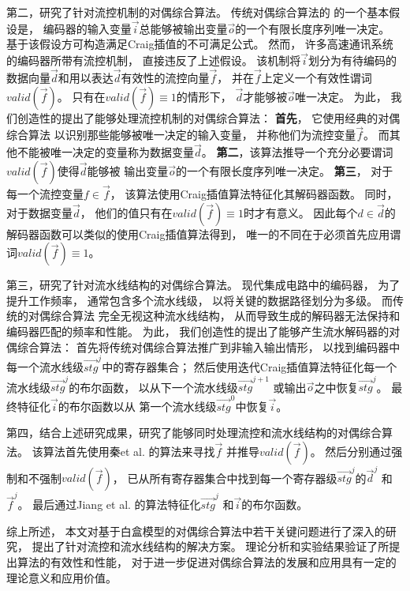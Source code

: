第二，研究了针对流控机制的对偶综合算法。
传统对偶综合算法的 的一个基本假设是，
编码器的输入变量$\vec{i}$总能够被输出变量$\vec{o}$的一个有限长度序列唯一决定。
基于该假设方可构造满足Craig插值的不可满足公式。
然而，
许多高速通讯系统的编码器所带有流控机制，
直接违反了上述假设。
该机制将$\vec{i}$划分为有待编码的数据向量$\vec{d}$和用以表达$\vec{d}$有效性的流控向量$\vec{f}$，
并在$\vec{f}$上定义一个有效性谓词$valid(\vec{f})$。
只有在$valid(\vec{f})\equiv 1$的情形下，
$\vec{d}$才能够被$\vec{o}$唯一决定。
为此，
我们创造性的提出了能够处理流控机制的对偶综合算法：
\textbf{首先}，
它使用经典的对偶综合算法
以识别那些能够被唯一决定的输入变量，
并称他们为流控变量$\vec{f}$。
而其他不能被唯一决定的变量称为数据变量$\vec{d}$。
\textbf{第二}，该算法推导一个充分必要谓词$valid(\vec{f})$使得$\vec{d}$能够被
输出变量$\vec{o}$的一个有限长度序列唯一决定。
\textbf{第三}，
对于每一个流控变量$f\in\vec{f}$，
该算法使用Craig插值算法特征化其解码器函数。
同时，
对于数据变量$\vec{d}$，
他们的值只有在$valid(\vec{f}) \equiv 1$时才有意义。
因此每个$d\in\vec{d}$的解码器函数可以类似的使用Craig插值算法得到，
唯一的不同在于必须首先应用谓词$valid(\vec{f}) \equiv 1$。



第三，研究了针对流水线结构的对偶综合算法。
现代集成电路中的编码器，
为了提升工作频率，
通常包含多个流水线级，
以将关键的数据路径划分为多级。
而传统的对偶综合算法
完全无视这种流水线结构，
从而导致生成的解码器无法保持和编码器匹配的频率和性能。
为此，
我们创造性的提出了能够产生流水解码器的对偶综合算法：
首先将传统对偶综合算法推广到非输入输出情形，
以找到编码器中每一个流水线级$\vec{stg}^j$中的寄存器集合；
然后使用迭代Craig插值算法特征化每一个流水线级$\vec{stg}^j$的布尔函数，
以从下一个流水线级$\vec{stg}^{j+1}$ 或输出$\vec{o}$之中恢复$\vec{stg}^j$。
最终特征化$\vec{i}$的布尔函数以从
第一个流水线级$\vec{stg}^0$中恢复$\vec{i}$。

第四，结合上述研究成果，研究了能够同时处理流控和流水线结构的对偶综合算法。
该算法首先使用秦et al. \cite{QinTODAES15}的算法来寻找$\vec{f}$ 并推导$valid(\vec{f})$。
然后分别通过强制和不强制$valid(\vec{f})$，
已从所有寄存器集合中找到每一个寄存器级$\vec{stg}^j$的$\vec{d}^j$ 和$\vec{f}^j$。
最后通过Jiang et al. \cite{InterpBoolFunction}的算法特征化$\vec{stg}^j$ 和$\vec{i}$的布尔函数。

综上所述，
本文对基于白盒模型的对偶综合算法中若干关键问题进行了深入的研究，
提出了针对流控和流水线结构的解决方案。
理论分析和实验结果验证了所提出算法的有效性和性能，
对于进一步促进对偶综合算法的发展和应用具有一定的理论意义和应用价值。

